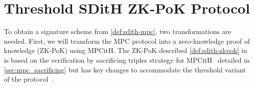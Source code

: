 \documentclass[11pt]{report}
\theoremstyle{definition}
\theoremstyle{plain}
\begin{document}











\section{Threshold SDitH ZK-PoK Protocol}\label{sec:sdith-zkpok}

To obtain a signature scheme from \autoref{def:sdith-mpc}, two transformations are needed. First, we will transform the MPC protocol into a zero-knowledge proof of knowledge (ZK-PoK) using MPCitH. The ZK-PoK described \autoref{def:sdith-zkpok} in is based on the verification by sacrificing triples strategy for MPCitH~\cite{baum2020concretely} detailed in \autoref{sec:mpc_sacrificing} but has key changes to accommodate the threshold variant of the protocol~\cite{feneuil2023threshold,feneuil2023threshold2}.
\end{document}
